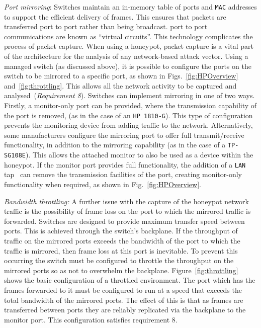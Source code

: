 \documentclass{ieeeaccess}
\begin{document}
\noindent\textit{Port mirroring}: Switches maintain an in-memory table of ports
and \texttt{MAC} addresses to support the efficient delivery of frames. This
ensures that packets are transferred port to port rather than being broadcast.
port to port communications are known as ``virtual circuits''. This technology
complicates the process of packet capture. When using a honeypot, packet
capture is a vital part of the architecture for the analysis of any
network-based attack vector. Using a managed switch (as discussed above), it is
possible to configure the ports on the switch to be mirrored to a specific
port, as shown in Figs.~\ref{fig:HPOverview} and~\ref{fig:throttling}. This
allows all the network activity to be captured and analysed~(\emph{Requirement
8}). Switches can implement mirroring in one of two ways. Firstly, a
monitor-only port can be provided, where the transmission capability of the
port is removed, (as in the case of an \texttt{HP 1810-G}). This type of
configuration prevents the monitoring device from adding traffic to the
network. Alternatively, some manufacturers configure the mirroring port to
offer full transmit/receive functionality, in addition to the mirroring
capability (as in the case of a \texttt{TP-SG108E}). This allows the attached
monitor to also be used as a device within the honeypot. If the monitor port
provides full functionality, the addition of a \texttt{LAN} tap~\cite{RB:13}
can remove the transmission facilities of the port, creating monitor-only
functionality when required, as shown in Fig.~\ref{fig:HPOverview}.
\newline

\noindent\textit{Bandwidth throttling:} A further issue with the capture of the
honeypot network traffic is the possibility of frame loss on the port to which
the mirrored traffic is forwarded.  Switches are designed to provide maximum
transfer speed between ports. This is achieved through the switch's backplane.
If the throughput of traffic on the mirrored ports exceeds the bandwidth of the
port to which the traffic is mirrored, then frame loss at this port is
inevitable. To prevent this occurring the switch must be configured to throttle
the throughput on the mirrored ports so as not to overwhelm the backplane.
Figure~\ref{fig:throttling} shows the basic configuration of a throttled
environment. The port which has the frames forwarded to it must be configured
to run at a speed that exceeds the total bandwidth of the mirrored ports. The
effect of this is that as frames are transferred between ports they are
reliably replicated via the backplane to the monitor port. This configuration
satisfies requirement 8. 
\newline
\end{document}
